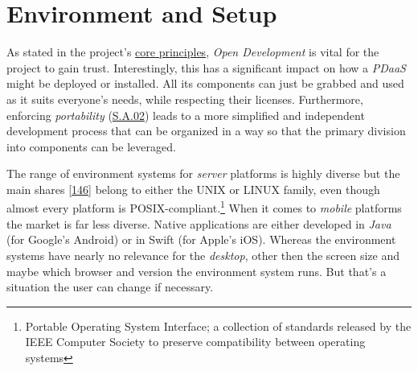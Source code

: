 \documentclass[12pt,english,a4paper,titlepage,cleardoublepage=empty,dottedtoc]{report}
\begin{document}
\section{Environment and Setup}\label{environment-and-setup}

As stated in the project's \protect\hyperlink{core-principles}{core
principles}, \emph{Open Development} is vital for the project to gain
trust. Interestingly, this has a significant impact on how a
\emph{PDaaS} might be deployed or installed. All its components can just
be grabbed and used as it suits everyone's needs, while respecting their
licenses. Furthermore, enforcing \emph{portability}
(\protect\hyperlink{sa02}{S.A.02}) leads to a more simplified and
independent development process that can be organized in a way so that
the primary division into components can be leveraged.

The range of environment systems for \emph{server} platforms is highly
diverse but the main shares
{[}\protect\hyperlink{ref-web_2017_wikipedia_os-market-share}{146}{]}
belong to either the UNIX or LINUX family, even though almost every
platform is POSIX-compliant.\footnote{Portable Operating System
  Interface; a collection of standards released by the IEEE Computer
  Society to preserve compatibility between operating systems} When it
comes to \emph{mobile} platforms the market is far less diverse. Native
applications are either developed in \emph{Java} (for Google's Android)
or in Swift (for Apple's iOS). Whereas the environment systems have
nearly no relevance for the \emph{desktop}, other then the screen size
and maybe which browser and version the environment system runs. But
that's a situation the user can change if necessary.
\end{document}
